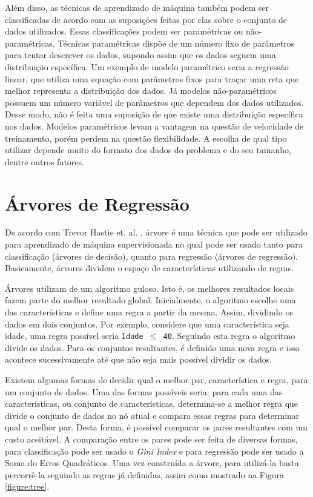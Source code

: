 Além disso, as técnicas de aprendizado de máquina também podem ser classificadas de acordo com as suposições feitas por elas sobre o conjunto de dados utilizados. Essas classificações podem ser paramétricas ou não-paramétricas. Técnicas paramétricas dispõe de um número fixo de parâmetros para tentar descrever os dados, supondo assim que os dados seguem uma distribuição específica. Um exemplo de modelo paramétrico seria a regressão linear, que utiliza uma equação com parâmetros fixos para traçar uma reta que melhor representa a distribuição dos dados. Já modelos não-paramétricos possuem um número variável de parâmetros que dependem dos dados utilizados. Desse modo, não é feita uma suposição de que existe uma distribuição específica nos dados. Modelos paramétricos levam a vantagem na questão de velocidade de treinamento, porém perdem na questão flexibilidade. A escolha de qual tipo utilizar depende muito do formato dos dados do problema e do seu tamanho, dentre outros fatores.

\section{Árvores de Regressão}

De acordo com Trevor Hastie et. al. \cite{hastie2005elements}, árvore é uma técnica que pode ser utilizado para aprendizado de máquina supervisionada no qual pode ser usado tanto para classificação (árvores de decisão), quanto para regressão (árvores de regressão). Basicamente, árvores dividem o espaço de características utilizando de regras.

Árvores utilizam de um algoritmo guloso. Isto é, os melhores resultados locais fazem parte do melhor resultado global. Inicialmente, o algoritmo escolhe uma das características e define uma regra a partir da mesma. Assim, dividindo os dados em dois conjuntos. Por exemplo, considere que uma característica seja idade, uma regra possível seria \texttt{Idade \(\leq\) 40}. Seguindo esta regra o algoritmo divide os dados. Para os conjuntos resultantes, é definido uma nova regra e isso acontece sucessivamente até que não seja mais possível dividir os dados.

Existem algumas formas de decidir qual o melhor par, característica e regra, para um conjunto de dados. Uma das formas possíveis seria: para cada uma das características, ou conjunto de características, determina-se a melhor regra que divide o conjunto de dados no nó atual e compara essas regras para determinar qual o melhor par. Desta forma, é possível comparar os pares resultantes com um custo aceitável. A comparação entre os pares pode ser feita de diversas formas, para classificação pode ser usado o \textit{Gini Index} e para regressão pode ser usado a Soma do Erros Quadráticos. Uma vez construída a árvore, para utilizá-la basta percorrê-la seguindo as regras já definidas, assim como mostrado na Figura \ref{figure:tree}.

